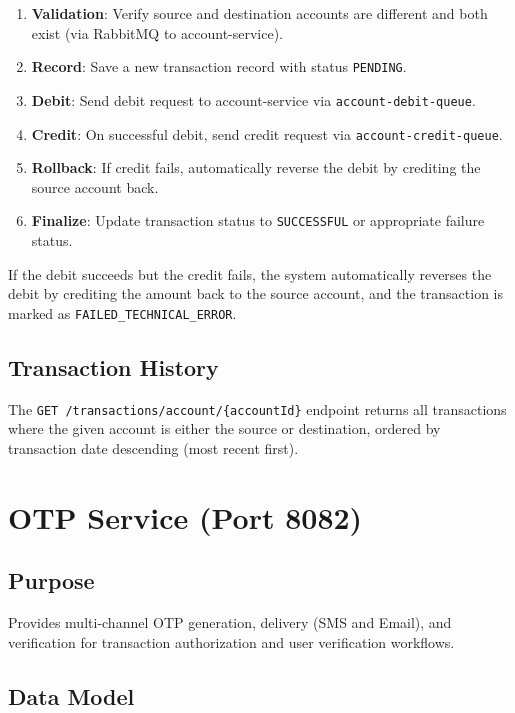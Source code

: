 \documentclass[12pt,a4paper]{report}
\begin{document}
\begin{enumerate}
    \item \textbf{Validation}: Verify source and destination accounts are different and both exist (via RabbitMQ to account-service).
    \item \textbf{Record}: Save a new transaction record with status \texttt{PENDING}.
    \item \textbf{Debit}: Send debit request to account-service via \texttt{account-debit-queue}.
    \item \textbf{Credit}: On successful debit, send credit request via \texttt{account-credit-queue}.
    \item \textbf{Rollback}: If credit fails, automatically reverse the debit by crediting the source account back.
    \item \textbf{Finalize}: Update transaction status to \texttt{SUCCESSFUL} or appropriate failure status.
\end{enumerate}

\begin{warnbox}
If the debit succeeds but the credit fails, the system automatically reverses the debit by crediting the amount back to the source account, and the transaction is marked as \texttt{FAILED\_TECHNICAL\_ERROR}.
\end{warnbox}

\subsection{Transaction History}
The \texttt{GET /transactions/account/\{accountId\}} endpoint returns all transactions where the given account is either the source or destination, ordered by transaction date descending (most recent first).

\section{OTP Service (Port 8082)}

\subsection{Purpose}
Provides multi-channel OTP generation, delivery (SMS and Email), and verification for transaction authorization and user verification workflows.

\subsection{Data Model}
\end{document}
